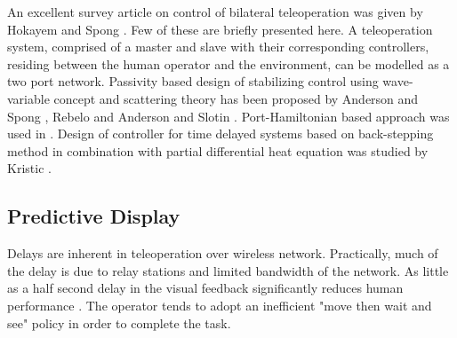 An excellent survey article on control of bilateral teleoperation was given by Hokayem and Spong \cite{hokayem2006bilateral}. Few of these are briefly presented here. A teleoperation system, comprised of a master and slave with their corresponding controllers, residing between the human operator and the environment,   can be modelled as a two port network. Passivity based design of stabilizing control using  wave-variable concept and scattering theory has been proposed by Anderson and Spong \cite{anderson1989bilateral}, Rebelo \cite{rebelo2015time} and Anderson and Slotin \cite{niemeyer1991stable}.   Port-Hamiltonian  based approach was used in \cite{stramigioli2010novel,stramigioli2005sampled}. Design of controller for time delayed systems  based on back-stepping method in combination with partial differential heat  equation was studied by  Kristic \cite{krstic2009delay}. 



\subsection{Predictive Display}
Delays are inherent in teleoperation over wireless network. Practically, much of the delay is due to relay stations and limited  bandwidth of the network.  As little as a half second delay in the visual feedback significantly reduces human performance \cite{chen2007human}. The operator tends to adopt an inefficient "move then wait and see" policy in order to complete the task.

